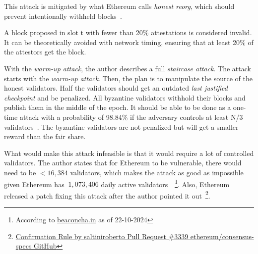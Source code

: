 This attack is mitigated by what Ethereum calls \textit{honest reorg}, which should prevent intentionally withheld blocks~\cite{cryptoeprint:2023/1622}.

A block proposed in slot t with fewer than 20\% attestations is considered invalid.
It can be theoretically avoided with network timing, ensuring that at least 20\% of the attestors get the block.


With the \textit{warm-up attack}, the author describes a full \textit{staircase attack}.
The attack starts with the \textit{warm-up attack}.
Then, the plan is to manipulate the source of the honest validators.
Half the validators should get an outdated \textit{last justified checkpoint} and be penalized.
All byzantine validators withhold their blocks and publish them in the middle of the epoch.
It should be able to be done as a one-time attack with a probability of 98.84\% if the adversary controls at least N/3 validators~\cite{cryptoeprint:2023/1622}.
The byzantine validators are not penalized but will get a smaller reward than the fair share.

What would make this attack infeasible is that it would require a lot of controlled validators.
The author states that for Ethereum to be vulnerable, there would need to be $<16,384$ validators, which makes the attack as good as impossible given Ethereum has $~1,073,406$ daily active validators~\cite{cryptoeprint:2023/1622}~\footnote{According to \href{https://beaconcha.in/charts/validators}{beaconcha.in} as of 22-10-2024}.
Also, Ethereum released a patch fixing this attack after the author pointed it out~\footnote{\href{https://github.com/ethereum/consensus-specs/pull/3339\#issuecomment-1637117341}{Confirmation Rule by saltiniroberto Pull Request \#3339 ethereum/consensus-specs GitHub}}.